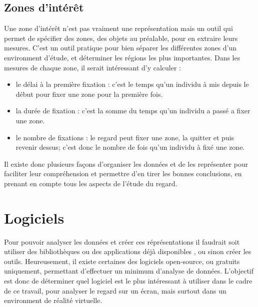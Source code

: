 \documentclass[12pt]{article}
\begin{document}
\subsection{Zones d'intérêt}

Une zone d'intérêt n'est pas vraiment une représentation mais un outil qui
permet de spécifier des zones, des objets au préalable, pour en extraire leurs
mesures. C'est un outil pratique pour bien séparer les différentes zones d'un
environment d'étude, et déterminer les régions les plus importantes. Dans les
mesures de chaque zone, il serait intéressant d'y calculer :

\begin{itemize}
  \item le délai à la première fixation : c'est le temps qu'un individu à mis
        depuis le début pour fixer une zone pour la première fois.
  \item la durée de fixation : c'est la somme du temps qu'un individu a passé a
        fixer une zone.
  \item le nombre de fixations : le regard peut fixer une zone, la quitter et
        puis revenir dessus; c'est donc le nombre de fois qu'un individu à fixé
        une zone.
\end{itemize}

\bigskip
Il existe donc plusieurs façons d'organiser les données et de les représenter
pour faciliter leur compréhension et permettre d'en tirer les bonnes
conclusions, en prenant en compte tous les aspects de l'étude du regard.


\section{Logiciels}

Pour pouvoir analyser les données et créer ces réprésentations il faudrait soit
utiliser des bibliothèques ou des applications déjà disponibles
\cite{imotions:software}, ou sinon créer les outils. Heureusement, il existe
certaines des logiciels open-source, ou gratuits uniquement, permettant
d'effectuer un minimum d'analyse de données. L'objectif est donc de déterminer
quel logiciel est le plus intéressant à utiliser dans le cadre de ce travail,
pour analyser le regard sur un écran, mais surtout dans un environment de
réalité virtuelle.
\end{document}
